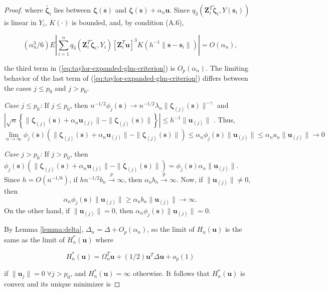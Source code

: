 \documentclass[12pt,english,authoryear, review]{article}\usepackage[]{graphicx}\usepackage[]{color}
\theoremstyle{plain}
\theoremstyle{plain}
\begin{document}
\begin{proof}
where $\tilde{\bm{\zeta}_{i}}$ lies between $\bm{\zeta}(\bm{s})$
and $\bm{\zeta}(\bm{s})+\alpha_{n}\bm{u}$. Since $q_{3}\left(\bm{Z}_{i}^{T}\tilde{\bm{\zeta}}_{i},Y\left(\bm{s}_{i}\right)\right)$
is linear in $Y_{i}$, $K\left(\cdot\right)$ is bounded, and, by
condition (A.6),

\[
\left(\alpha_{n}^{3}/6\right)E\left|\sum_{i=1}^{n}q_{3}\left(\bm{Z}_{i}^{T}\tilde{\bm{\zeta}}_{i},Y_{i}\right)\left[\bm{Z}_{i}^{T}\bm{u}\right]^{3}K\left(h^{-1}\|\bm{s}-\bm{s}_{i}\|\right)\right|=O\left(\alpha_{n}\right),
\]


the third term in (\ref{eq:taylor-expanded-glm-criterion}) is $O_{p}\left(\alpha_{n}\right)$.
The limiting behavior of the last term of (\ref{eq:taylor-expanded-glm-criterion})
differs between the cases $j\le p_{0}$ and $j>p_{0}$.

\emph{Case $j\le p_{0}$:} If $j\le p_{0}$, then $n^{-1/2}\phi_{j}(\bm{s})\to n^{-1/2}\lambda_{n}\|\bm{\zeta}_{\left(j\right)}(\bm{s})\|^{-\gamma}$
and $|\sqrt{n}\left\{ \|\bm{\zeta}_{\left(j\right)}(\bm{s})+\alpha_{n}\bm{u}_{\left(j\right)}\|-\|\bm{\zeta}_{\left(j\right)}(\bm{s})\|\right\} |\le h^{-1}\|\bm{u}_{\left(j\right)}\|$
. Thus, 
\[
\lim\limits _{n\to\infty}\phi_{j}(\bm{s})\left(\|\bm{\zeta}_{\left(j\right)}(\bm{s})+\alpha_{n}\bm{u}_{\left(j\right)}\|-\|\bm{\zeta}_{\left(j\right)}(\bm{s})\|\right)\le\alpha_{n}\phi_{j}(\bm{s})\|\bm{u}_{\left(j\right)}\|\le\alpha_{n}a_{n}\|\bm{u}_{\left(j\right)}\|\to0
\]


\emph{Case $j>p_{0}$:} If $j>p_{0}$, then $\phi_{j}(\bm{s})\left(\|\bm{\zeta}_{\left(j\right)}(\bm{s})+\alpha_{n}\bm{u}_{\left(j\right)}\|-\|\bm{\zeta}_{\left(j\right)}(\bm{s})\|\right)=\phi_{j}(\bm{s})\alpha_{n}\|\bm{u}_{\left(j\right)}\|$.
Since $h=O(n^{-1/6})$, if $hn^{-1/2}b_{n}\xrightarrow{p}\infty$,
then $\alpha_{n}b_{n}\xrightarrow{p}\infty$. Now, if $\|\bm{u}_{\left(j\right)}\|\ne0$,
then 
\[
\alpha_{n}\phi_{j}(\bm{s})\|\bm{u}_{\left(j\right)}\|\ge\alpha_{n}b_{n}\|\bm{u}_{\left(j\right)}\|\to\infty.
\]
On the other hand, if $\|\bm{u}_{\left(j\right)}\|=0$, then $\alpha_{n}\phi_{j}(\bm{s})\|\bm{u}_{\left(j\right)}\|=0$.

By Lemma \ref{lemma:delta}, $\Delta_{n}=\Delta+O_{p}\left(\alpha_{n}\right)$,
so the limit of $H_{n}\left(\bm{u}\right)$ is the same as the limit
of $H_{n}^{*}\left(\bm{u}\right)$ where

\[
H_{n}^{*}\left(\bm{u}\right)=\Omega_{n}^{T}\bm{u}+(1/2)\bm{u}^{T}\Delta\bm{u}+o_{p}\left(1\right)
\]
 

if $\|\bm{u}_{j}\|=0\;\forall j>p_{0}$, and $H_{n}^{*}\left(\bm{u}\right)=\infty$
otherwise. It follows that $H_{n}^{*}\left(\bm{u}\right)$ is convex
and its unique minimizer is


\end{proof}
\end{document}
